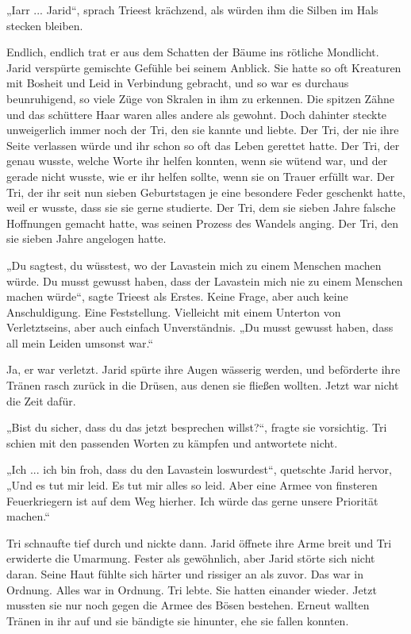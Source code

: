 „Iarr ... Jarid“, sprach Trieest krächzend, als würden ihm die Silben im Hals stecken bleiben.

Endlich, endlich trat er aus dem Schatten der Bäume ins rötliche Mondlicht. Jarid verspürte gemischte Gefühle bei seinem Anblick. Sie hatte so oft Kreaturen mit Bosheit und Leid in Verbindung gebracht, und so war es durchaus beunruhigend, so viele Züge von Skralen in ihm zu erkennen. Die spitzen Zähne und das schüttere Haar waren alles andere als gewohnt. Doch dahinter steckte unweigerlich immer noch der Tri, den sie kannte und liebte. Der Tri, der nie ihre Seite verlassen würde und ihr schon so oft das Leben gerettet hatte. Der Tri, der genau wusste, welche Worte ihr helfen konnten, wenn sie wütend war, und der gerade nicht wusste, wie er ihr helfen sollte, wenn sie on Trauer erfüllt war. Der Tri, der ihr seit nun sieben Geburtstagen je eine besondere Feder geschenkt hatte, weil er wusste, dass sie sie gerne studierte. Der Tri, dem sie sieben Jahre falsche Hoffnungen gemacht hatte, was seinen Prozess des Wandels anging. Der Tri, den sie sieben Jahre angelogen hatte.

„Du sagtest, du wüsstest, wo der Lavastein mich zu einem Menschen machen würde. Du musst gewusst haben, dass der Lavastein mich nie zu einem Menschen machen würde“, sagte Trieest als Erstes. Keine Frage, aber auch keine Anschuldigung. Eine Feststellung. Vielleicht mit einem Unterton von Verletztseins, aber auch einfach Unverständnis. „Du musst gewusst haben, dass all mein Leiden umsonst war.“

Ja, er war verletzt. Jarid spürte ihre Augen wässerig werden, und beförderte ihre Tränen rasch zurück in die Drüsen, aus denen sie fließen wollten. Jetzt war nicht die Zeit dafür.

„Bist du sicher, dass du das jetzt besprechen willst?“, fragte sie vorsichtig. Tri schien mit den passenden Worten zu kämpfen und antwortete nicht.

„Ich ... ich bin froh, dass du den Lavastein loswurdest“, quetschte Jarid hervor, „Und es tut mir leid. Es tut mir alles so leid. Aber eine Armee von finsteren Feuerkriegern ist auf dem Weg hierher. Ich würde das gerne unsere Priorität machen.“

Tri schnaufte tief durch und nickte dann. Jarid öffnete ihre Arme breit und Tri erwiderte die Umarmung. Fester als gewöhnlich, aber Jarid störte sich nicht daran. Seine Haut fühlte sich härter und rissiger an als zuvor. Das war in Ordnung. Alles war in Ordnung. Tri lebte. Sie hatten einander wieder. Jetzt mussten sie nur noch gegen die Armee des Bösen bestehen. Erneut wallten Tränen in ihr auf und sie bändigte sie hinunter, ehe sie fallen konnten.\bigskip







